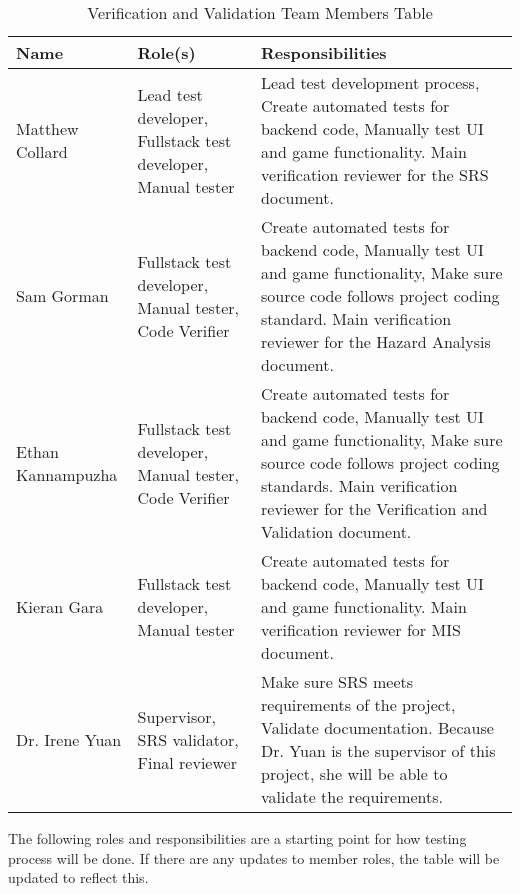 \documentclass[12pt, titlepage]{article}
\begin{document}
\begin{table}[H]
\caption{Verification and Validation Team Members Table}
\centering
\begin{tabular}{|l|p{1.8in}|p{2.5in}|}
\hline
\textbf{Name}            & \textbf{Role(s)}                                       & \textbf{Responsibilities}                                                                                                                                             \\ \hline
Matthew Collard          & Lead test developer, Fullstack test developer, Manual tester               & Lead test development process, Create automated tests for backend code, Manually test UI and game functionality. Main verification reviewer for the SRS document. \\ \hline
Sam Gorman             & Fullstack test developer, Manual tester, Code Verifier       & Create automated tests for backend code, Manually test UI and game functionality, Make sure source code follows project coding standard. Main verification reviewer for the Hazard Analysis document.                                                            \\ \hline
Ethan Kannampuzha         & Fullstack test developer, Manual tester, Code Verifier                & Create automated tests for backend code, Manually test UI and game functionality, Make sure source code follows project coding standards. Main verification reviewer for the Verification and Validation document.                                                                                               \\ \hline
Kieran Gara            & Fullstack test developer, Manual tester        & Create automated tests for backend code, Manually test UI and game functionality. Main verification reviewer for MIS document.                                            \\ \hline
Dr. Irene Yuan & Supervisor, SRS validator, Final reviewer &  Make sure SRS meets requirements of the project, Validate documentation. Because Dr. Yuan is the supervisor of this project, she will be able to validate the requirements.\\ \hline
\end{tabular}
\end{table}

The following roles and responsibilities are a starting point for how testing process will be done. If there are any updates to member roles, the table will be updated to reflect this.
\end{document}
